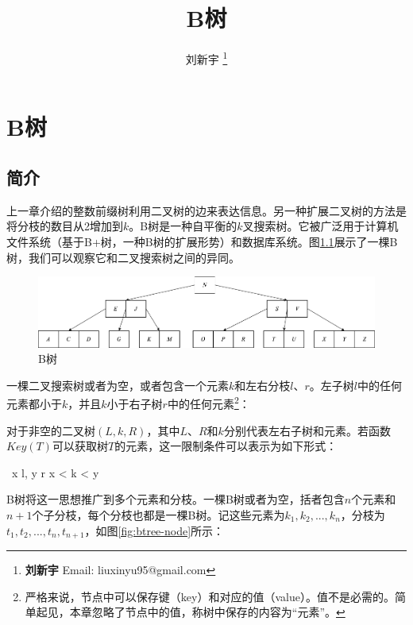 \documentclass{ctexart}
\begin{document}
\title{B树}

\author{刘新宇
\thanks{{\bfseries 刘新宇 } \newline
  Email: liuxinyu95@gmail.com \newline}
  }

\maketitle
\fi


\ifx\wholebook\relax
\chapter{B树}
\fi

\section{简介}
\label{introduction}

上一章介绍的整数前缀树利用二叉树的边来表达信息。另一种扩展二叉树的方法是将分枝的数目从2增加到$k$。B树是一种自平衡的$k$叉搜索树\cite{wiki-b-tree}。它被广泛用于计算机文件系统（基于B+树，一种B树的扩展形势）和数据库系统。图\ref{fig:btree-example}展示了一棵B树，我们可以观察它和二叉搜索树之间的异同。

\begin{figure}[htbp]
  \centering
  \includegraphics[scale=0.33]{img/btree-del-before.png}
  \caption{B树}
  \label{fig:btree-example}
\end{figure}

一棵二叉搜索树或者为空，或者包含一个元素$k$和左右分枝$l$、$r$。左子树$l$中的任何元素都小于$k$，并且$k$小于右子树$r$中的任何元素\footnote{严格来说，节点中可以保存键（key）和对应的值（value）。值不是必需的。简单起见，本章忽略了节点中的值，称树中保存的内容为“元素”。}：

对于非空的二叉树$(L, k, R)$，其中$L$、$R$和$k$分别代表左右子树和元素。若函数$Key(T)$可以获取树$T$的元素，这一限制条件可以表示为如下形式：

\be
\forall\ x \in l, y \in r \Rightarrow x < k < y
\ee

B树将这一思想推广到多个元素和分枝。一棵B树或者为空，括者包含$n$个元素和$n + 1$个子分枝，每个分枝也都是一棵B树。记这些元素为$k_1, k_2, ..., k_n$，分枝为$t_1, t_2, ..., t_n, t_{n+1}$，如图\ref{fig:btree-node}所示：
\end{document}
